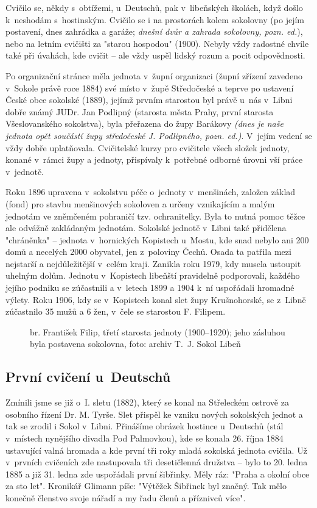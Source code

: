 \documentclass[a5paper, 12pt, twoside]{article}
\newcommand{\pozned}[1]{%
\textit{#1}}
\begin{document}
Cvičilo se, někdy s~obtížemi, u~Deutschů, pak v~libeňských školách, když došlo k~neshodám s~hostinským. Cvičilo se i na prostorách kolem sokolovny (po jejím postavení, dnes zahrádka a garáže; \pozned{dnešní dvůr a zahrada sokolovny, pozn. ed.}), nebo na letním cvičišti za "starou hospodou" (1900). Nebyly vždy radostné chvíle také při úvahách, kde cvičit – ale vždy uspěl lidský rozum a pocit odpovědnosti. 

Po organizační stránce měla jednota v~župní organizaci (župní zřízení zavedeno v~Sokole právě roce 1884) své místo v~župě Středočeské a teprve po ustavení České obce sokolské (1889), jejímž prvním starostou byl právě u~nás v~Libni dobře známý JUDr. Jan Podlipný (starosta města Prahy, první starosta Všeslovanského sokolstva), byla přeřazena do župy Barákovy \pozned{(dnes je naše jednota opět součástí župy středočeské J. Podlipného, pozn. ed.)}. V~jejím vedení se vždy dobře uplatňovala. Cvičitelské kurzy pro cvičitele všech složek jednoty, konané v~rámci župy a jednoty, přispívaly k~potřebné odborné úrovni vší práce v~jednotě.

Roku 1896 upravena v~sokolstvu péče o~jednoty v~menšinách, založen základ (fond) pro stavbu menšinových sokoloven a určeny vznikajícím a malým jednotám ve zněmčeném pohraničí tzv. ochranitelky. Byla to nutná pomoc těžce ale odvážně zakládaným jednotám. Sokolské jednotě v~Libni také přidělena "chráněnka" – jednota v~hornických Kopistech u~Mostu, kde snad nebylo ani 200 domů a necelých 2000 obyvatel, jen z~poloviny Čechů. Osada ta patřila mezi nejstarší a nejdůležitější v~celém kraji. Zanikla roku 1979, kdy musela ustoupit uhelným dolům. Jednotu v~Kopistech libeňští pravidelně podporovali, každého jejího podniku se zúčastnili a v~letech 1899 a 1904 k~ní uspořádali hromadné výlety. Roku 1906, kdy se v~Kopistech konal slet župy Krušnohorské, se z~Libně zúčastnilo 35 mužů a 6 žen, v~čele se starostou F. Filipem.

\begin{figure*}[h!]
  \centering
  \caption*{br. František Filip, třetí starosta jednoty (1900–⁠⁠⁠⁠⁠⁠1920); jeho zásluhou byla postavena sokolovna, foto: archiv T.~J. Sokol Libeň}
\end{figure*}

\subsection{První cvičení u~Deutschů}
Zmínili jsme se již o~I. sletu (1882), který se konal na Střeleckém ostrově za osobního řízení Dr. M. Tyrše. Slet přispěl ke vzniku nových sokolských jednot a tak se zrodil i Sokol v~Libni. Přinášíme obrázek hostince u~Deutschů (stál v~místech nynějšího divadla Pod Palmovkou), kde se konala 26. října 1884 ustavující valná hromada a kde první tři roky mladá sokolská jednota cvičila. Už v~prvních cvičeních zde nastupovala tři desetičlenná družstva – bylo to 20. ledna 1885 a již 31. ledna zde uspořádali první šibřinky. Měly ráz: "Praha a okolní obce za sto let". Kronikář Glimann píše: "Výtěžek Šibřinek byl značný. Tak mělo konečně členstvo svoje nářadí a my řadu členů a příznivců více".
\end{document}
